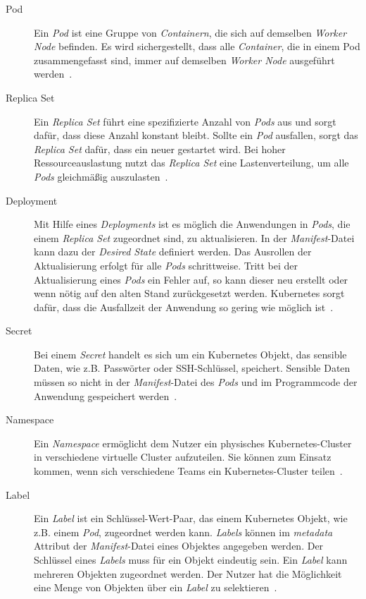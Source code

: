 \begin{description}
      \item[Pod]
            Ein \textit{Pod} ist eine Gruppe von \textit{Containern}, die sich auf demselben \textit{Worker Node} befinden.
            Es wird sichergestellt, dass alle \textit{Container}, die in einem Pod zusammengefasst sind,
            immer auf demselben \textit{Worker Node} ausgeführt werden~\cite{kubernetes-objects-kodekloud,kubernetes-in-action-chapter-3}.
      \item[Replica Set]
            Ein \textit{Replica Set} führt eine spezifizierte Anzahl von \textit{Pods} aus und sorgt dafür, dass diese Anzahl konstant bleibt.
            Sollte ein \textit{Pod} ausfallen, sorgt das \textit{Replica Set} dafür, dass ein neuer gestartet wird. Bei hoher Ressourceauslastung
            nutzt das \textit{Replica Set} eine Lastenverteilung, um alle \textit{Pods} gleichmäßig auszulasten~\cite{kubernetes-replica-set-kubematic}.
      \item[Deployment]
            Mit Hilfe eines \textit{Deployments} ist es möglich die Anwendungen in \textit{Pods}, die einem \textit{Replica Set} zugeordnet sind, zu aktualisieren.
            In der \textit{Manifest}-Datei kann dazu der \textit{Desired State} definiert werden.
            Das Ausrollen der Aktualisierung erfolgt für alle \textit{Pods} schrittweise.
            Tritt bei der Aktualisierung eines \textit{Pods} ein Fehler auf, so kann dieser neu erstellt oder wenn nötig auf den alten Stand zurückgesetzt werden.
            Kubernetes sorgt dafür, dass die Ausfallzeit der Anwendung so gering wie möglich ist~\cite{kubernetes-in-action-chapter-9,kubernetes-deployment-vmware}.
      \item[Secret]
            Bei einem \textit{Secret} handelt es sich um ein Kubernetes Objekt, das sensible Daten, wie z.B. Passwörter oder SSH-Schlüssel, speichert.
            Sensible Daten müssen so nicht in der \textit{Manifest}-Datei des \textit{Pods} und im Programmcode der Anwendung gespeichert werden~\cite{kubernetes-secrets,kubernetes-secrets-medium}.
      \item[Namespace]
            Ein \textit{Namespace} ermöglicht dem Nutzer ein physisches Kubernetes-Cluster in verschiedene virtuelle Cluster aufzuteilen.
            Sie können zum Einsatz kommen, wenn sich verschiedene Teams ein Kubernetes-Cluster teilen~\cite{kubernetes-namespaces-vmware}.
      \item[Label]
            Ein \textit{Label} ist ein Schlüssel-Wert-Paar, das einem Kubernetes Objekt, wie z.B. einem \textit{Pod}, zugeordnet werden kann.
            \textit{Labels} können im \textit{metadata} Attribut der \textit{Manifest}-Datei eines Objektes angegeben werden.
            Der Schlüssel eines \textit{Labels} muss für ein Objekt eindeutig sein. Ein \textit{Label} kann mehreren Objekten zugeordnet werden.
            Der Nutzer hat die Möglichkeit eine Menge von Objekten über ein \textit{Label} zu selektieren~\cite{kubernetes-labels}.
\end{description}

